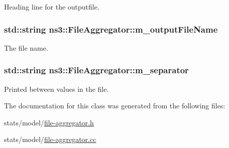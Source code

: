 Heading line for the outputfile. 

\subsubsection[{\texorpdfstring{m\+\_\+output\+File\+Name}{m_outputFileName}}]{\setlength{\rightskip}{0pt plus 5cm}std\+::string ns3\+::\+File\+Aggregator\+::m\+\_\+output\+File\+Name\hspace{0.3cm}{\ttfamily [private]}}\hypertarget{classns3_1_1FileAggregator_ad3840bfc503a61e0020746fdc88d7be3}{}\label{classns3_1_1FileAggregator_ad3840bfc503a61e0020746fdc88d7be3}


The file name. 

\subsubsection[{\texorpdfstring{m\+\_\+separator}{m_separator}}]{\setlength{\rightskip}{0pt plus 5cm}std\+::string ns3\+::\+File\+Aggregator\+::m\+\_\+separator\hspace{0.3cm}{\ttfamily [private]}}\hypertarget{classns3_1_1FileAggregator_a1f74a4c07f663d535da56dfb70414a15}{}\label{classns3_1_1FileAggregator_a1f74a4c07f663d535da56dfb70414a15}


Printed between values in the file. 



The documentation for this class was generated from the following files\+:\begin{DoxyCompactItemize}
\item 
stats/model/\hyperlink{file-aggregator_8h}{file-\/aggregator.\+h}\item 
stats/model/\hyperlink{file-aggregator_8cc}{file-\/aggregator.\+cc}\end{DoxyCompactItemize}
